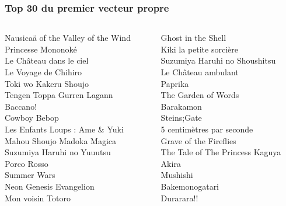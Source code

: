 \documentclass[handout]{beamer}
\begin{document}
\begin{frame}
    \frametitle{Top 30 du premier vecteur propre}
    \begin{columns}
    \begin{column}{0.5\textwidth}
  Nausicaä of the Valley of the Wind\\
                  Princesse Mononoké\\
             Le Château dans le ciel\\
                Le Voyage de Chihiro\\
               Toki wo Kakeru Shoujo\\
          Tengen Toppa Gurren Lagann\\
                            Baccano!\\
                        Cowboy Bebop\\
     Les Enfants Loups : Ame \& Yuki\\
          Mahou Shoujo Madoka Magica\\
          Suzumiya Haruhi no Yuuutsu\\
                         Porco Rosso\\
                         Summer Wars\\
             Neon Genesis Evangelion\\
                   Mon voisin Totoro\\
    \end{column}
    \begin{column}{0.5\textwidth}
                  Ghost in the Shell\\
             Kiki la petite sorcière\\
       Suzumiya Haruhi no Shoushitsu\\
                 Le Château ambulant\\
                             Paprika\\
                 The Garden of Words\\
                           Barakamon\\
                         Steins\string;Gate\\
           5 centimètres par seconde\\
              Grave of the Fireflies\\
     The Tale of The Princess Kaguya\\
                               Akira\\
                            Mushishi\\
                      Bakemonogatari\\
                          Durarara!!
    \end{column}
    \end{columns}
\end{frame}
\end{document}
